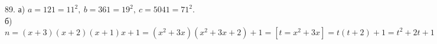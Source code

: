 89. а) $a=121=11^2,\ b=361=19^2,\ c=5041=71^2.$\\
б) $n=(x+3)(x+2)(x+1)x+1=(x^2+3x)(x^2+3x+2)+1=[t=x^2+3x]=t(t+2)+1=t^2+2t+1=(t+1)^2.$\\
